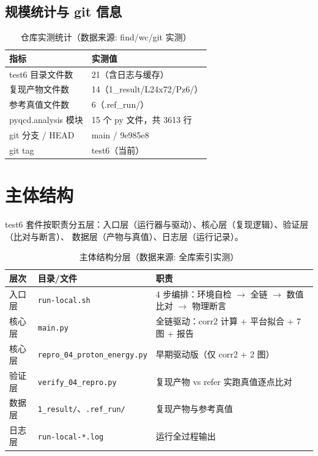 \documentclass[UTF8]{ctexart}
\begin{document}
\subsection{规模统计与 git 信息}
\begin{table}[htbp]\centering
\begin{tabular}{ll}
\toprule
指标 & 实测值 \\
\midrule
test6 目录文件数 & 21（含日志与缓存） \\
复现产物文件数 & 14（1\_result/L24x72/Pz6/） \\
参考真值文件数 & 6（.ref\_run/） \\
pyqcd.analysis 模块 & 15 个 py 文件，共 3613 行 \\
git 分支 / HEAD & main / 9e985e8 \\
git tag & test6（当前） \\
\bottomrule
\end{tabular}
\caption{仓库实测统计（数据来源: find/wc/git 实测）}
\end{table}

\section{主体结构}
test6 套件按职责分五层：入口层（运行器与驱动）、核心层（复现逻辑）、验证层（比对与断言）、
数据层（产物与真值）、日志层（运行记录）。
\begin{table}[htbp]\centering
\begin{tabularx}{\textwidth}{llX}
\toprule
\textcolor{struct}{层次} & 目录/文件 & \textcolor{struct}{职责} \\
\midrule
入口层 & \texttt{\nolinkurl{run-local.sh}} & 4 步编排：环境自检 $\rightarrow$ 全链 $\rightarrow$ 数值比对 $\rightarrow$ 物理断言 \\
核心层 & \texttt{\nolinkurl{main.py}} & 全链驱动：corr2 计算 + 平台拟合 + 7 图 + 报告 \\
核心层 & \texttt{\nolinkurl{repro_04_proton_energy.py}} & 早期驱动版（仅 corr2 + 2 图） \\
验证层 & \texttt{\nolinkurl{verify_04_repro.py}} & 复现产物 vs refer 实跑真值逐点比对 \\
数据层 & \texttt{\nolinkurl{1_result/}}、\texttt{\nolinkurl{.ref_run/}} & 复现产物与参考真值 \\
日志层 & \texttt{\nolinkurl{run-local-*.log}} & 运行全过程输出 \\
\bottomrule
\end{tabularx}
\caption{主体结构分层（数据来源: 全库索引实测）}
\end{table}
\end{document}
